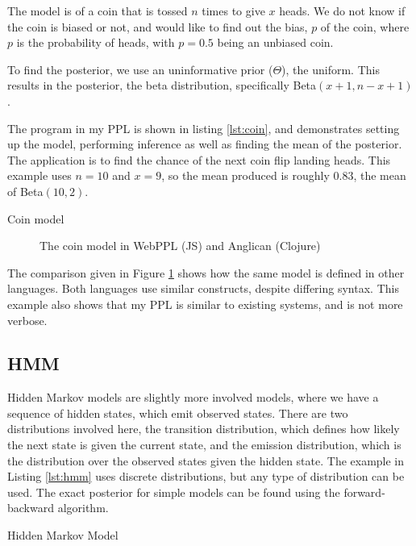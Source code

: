 The model is of a coin that is tossed $n$ times to give $x$ heads. We do not know if the coin is biased or not, and would like to find out the bias, $p$ of the coin, where $p$ is the probability of heads, with $p=0.5$ being an unbiased coin.

To find the posterior, we use an uninformative prior ($\Theta$), the uniform. This results in the posterior, the beta distribution, specifically Beta$(x+1,n-x+1)$.

The program in my PPL is shown in listing \ref{lst:coin}, and demonstrates setting up the model, performing inference as well as finding the mean of the posterior. The application is to find the chance of the next coin flip landing heads. This example uses $n=10$ and $x=9$, so the mean produced is roughly 0.83, the mean of Beta$(10,2)$.

\begin{listing}[!ht]
	\caption{Coin model}
	\label{lst:coin}
\end{listing}


\begin{figure}[!htb]
	\begin{minipage}{0.5\textwidth}
		\centering
	\end{minipage}
	\begin{minipage}{0.5\textwidth}
		\centering
	\end{minipage}
	\caption{The coin model in WebPPL (JS) and Anglican (Clojure)}
	\label{fig:compare-coin}
\end{figure}

The comparison given in Figure \ref{fig:compare-coin} shows how the same model is defined in other languages. Both languages use similar constructs, despite differing syntax. This example also shows that my PPL is similar to existing systems, and is not more verbose.

\subsection{HMM}
Hidden Markov models are slightly more involved models, where we have a sequence of hidden states, which emit observed states. There are two distributions involved here, the transition distribution, which defines how likely the next state is given the current state, and the emission distribution, which is the distribution over the observed states given the hidden state. The example in Listing \ref{lst:hmm} uses discrete distributions, but any type of distribution can be used. The exact posterior for simple models can be found using the forward-backward algorithm.
\begin{listing}[!ht]
	\caption{Hidden Markov Model}
	\label{lst:hmm}
\end{listing}

